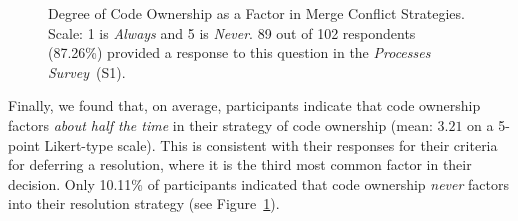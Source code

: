 \begin{figure}[!htbp]
\centering
{}
\caption{Degree of Code Ownership as a Factor in Merge Conflict Strategies. Scale: 1 is \textit{Always} and 5 is \textit{Never}. 89 out of 102 respondents (87.26\%) provided a response to this question in the \textit{Processes Survey}~(S1).\vspace*{-0.3\baselineskip}}
\label{fig:code-ownership-resolution}
\end{figure}


Finally, we found that, on average, participants indicate that code ownership factors \textit{about half the time} in their strategy of code ownership (mean: $3.21$ on a 5-point Likert-type scale).
This is consistent with their responses for their criteria for deferring a resolution, where it is the third most common factor in their decision. 
Only 10.11\% of participants indicated that code ownership \textit{never} factors into their resolution strategy (see Figure~\ref{fig:code-ownership-resolution}).

